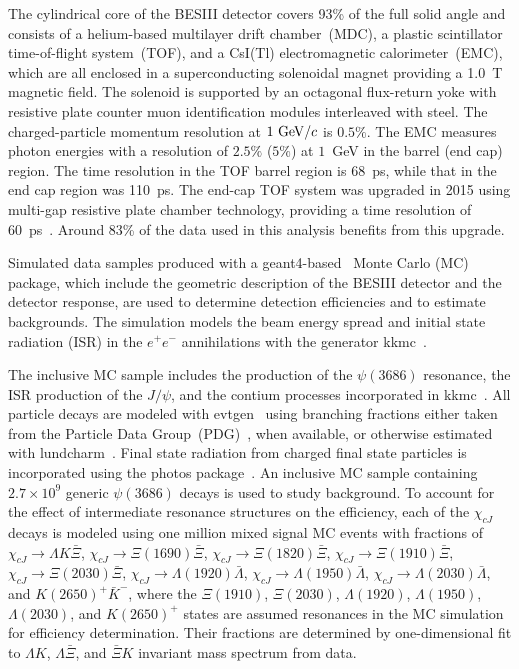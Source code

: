 \documentclass[amsmath,amssymb,twocolumn,prd,floatfix,showpacs,nofootinbib]{revtex4-1}
\begin{document}
The cylindrical core of the BESIII detector covers 93\% of the full solid angle and consists of a helium-based
 multilayer drift chamber~(MDC), a plastic scintillator time-of-flight
system~(TOF), and a CsI(Tl) electromagnetic calorimeter~(EMC),
which are all enclosed in a superconducting solenoidal magnet
providing a 1.0~T magnetic field.
The solenoid is supported by an
octagonal flux-return yoke with resistive plate counter muon
identification modules interleaved with steel.
The charged-particle momentum resolution at $1~{\rm GeV}/c$ is
$0.5\%$. 
The EMC measures photon energies with a
resolution of $2.5\%$ ($5\%$) at $1$~GeV in the barrel (end cap)
region. The time resolution in the TOF barrel region is 68~ps, while
that in the end cap region was 110~ps.
The end-cap TOF system was upgraded in 2015 using multi-gap resistive plate chamber technology, providing a time resolution of 60~ps~\cite{Tof1,Tof2,Tof3}. Around 83\% of the data used in this analysis benefits from this upgrade.

Simulated data samples produced with a {\sc
geant4}-based~\cite{Geant4} Monte Carlo (MC) package, which
include the geometric description of the BESIII detector and the
detector response, are used to determine detection efficiencies
and to estimate backgrounds. The simulation models the beam
energy spread and initial state radiation (ISR) in the $e^+e^-$
annihilations with the generator {\sc
kkmc}~\cite{Jadach01}.


The inclusive MC sample includes the production of the
$\psi(3686)$ resonance, the ISR production of the $J/\psi$, and
the contium processes incorporated in {\sc
kkmc}~\cite{Jadach01}.
All particle decays are modeled with {\sc
evtgen}~\cite{Lange01,Lange02} using branching fractions
either taken from the
Particle Data Group~(PDG)~\cite{ref::pdg2024}, when available,
or otherwise estimated with {\sc lundcharm}~\cite{Lundcharm00}.
Final state radiation
from charged final state particles is incorporated using the {\sc
photos} package~\cite{PHOTOS}.
An inclusive MC sample containing $2.7\times10^{9}$ generic $\psi(3686)$ decays is used to study background.
To account for the effect of intermediate
resonance structures on the efficiency, each of the $\chi_{cJ}$
decays is modeled using one million mixed signal
MC events with fractions of
$\chi_{cJ}\to  \Lambda K \bar \Xi$,
$\chi_{cJ}\to \Xi(1690) \bar \Xi$,
$\chi_{cJ}\to \Xi(1820) \bar \Xi$,
$\chi_{cJ}\to \Xi(1910) \bar \Xi$,
$\chi_{cJ}\to \Xi(2030) \bar \Xi$,
$\chi_{cJ}\to \Lambda(1920) \bar \Lambda$,
$\chi_{cJ}\to \Lambda(1950) \bar \Lambda$,
$\chi_{cJ}\to \Lambda(2030) \bar \Lambda$,
and $K(2650)^+ \bar K^-$, where the $\Xi(1910)$, $\Xi(2030)$, $\Lambda(1920)$, $\Lambda(1950)$, $\Lambda(2030)$, and $K(2650)^+$ states are assumed resonances in the MC simulation for efficiency determination. Their fractions are determined by one-dimensional fit to $\Lambda K$, $\Lambda\bar{\Xi}$, and $\bar{\Xi}K$ invariant mass spectrum from data.
\end{document}
